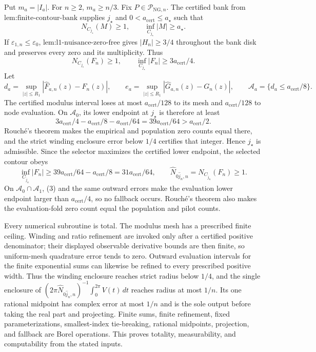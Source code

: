 Put \(m_a=|I_a|\).  For \(n\ge2\), \(m_a\ge n/3\).  Fix \(P\in\mathcal P_{\mathrm{NG},n}\).  The certified bank from \(\text{lem:finite-contour-bank}\) supplies \(j_{\star}\) and \(0<a_{\mathrm{cert}}\le a_{\star}\) such that
\[
 N_{C_{j_{\star}}}(M)\ge1,
 \qquad \inf_{C_{j_{\star}}}|M|\ge a_{\star}.
\]
If \(\varepsilon_{1,n}\le\varepsilon_0\), \(\text{lem:l1-nuisance-zero-free}\) gives \(|H_n|\ge3/4\) throughout the bank disk and preserves every zero and its multiplicity.  Thus
\[
 N_{C_{j_{\star}}}(F_n)\ge1,
 \qquad \inf_{C_{j_{\star}}}|F_n|\ge3a_{\mathrm{cert}}/4. \tag{1}
\]
Let
\[
 d_a=\sup_{|z|\le R_1}|\widehat F_{a,n}(z)-F_n(z)|,
 \qquad
 e_a=\sup_{|z|\le R_1}|\widehat G_{a,n}(z)-G_n(z)|,
 \qquad
 \mathcal A_a=\{d_a\le a_{\mathrm{cert}}/8\}.
\]
The certified modulus interval loses at most \(a_{\mathrm{cert}}/128\) to its mesh and \(a_{\mathrm{cert}}/128\) to node evaluation.  On \(\mathcal A_0\), its lower endpoint at \(j_{\star}\) is therefore at least
\[
 3a_{\mathrm{cert}}/4-a_{\mathrm{cert}}/8-a_{\mathrm{cert}}/64
 =39a_{\mathrm{cert}}/64>a_{\mathrm{cert}}/2. \tag{2}
\]
Rouch\'e's theorem makes the empirical and population zero counts equal there, and the strict winding enclosure error below \(1/4\) certifies that integer.  Hence \(j_{\star}\) is admissible.  Since the selector maximizes the certified lower endpoint, the selected contour obeys
\[
 \inf_{C_{\widehat j_n}}|F_n|
 \ge39a_{\mathrm{cert}}/64-a_{\mathrm{cert}}/8
 =31a_{\mathrm{cert}}/64,
 \qquad
 \widehat N_{0\widehat j_n,n}=N_{C_{\widehat j_n}}(F_n)\ge1. \tag{3}
\]
On \(\mathcal A_0\cap\mathcal A_1\), (3) and the same outward errors make the evaluation lower endpoint larger than \(a_{\mathrm{cert}}/4\), so no fallback occurs.  Rouch\'e's theorem also makes the evaluation-fold zero count equal the population and pilot counts.

Every numerical subroutine is total.  The modulus mesh has a prescribed finite ceiling.  Winding and ratio refinement are invoked only after a certified positive denominator; their displayed observable derivative bounds are then finite, so uniform-mesh quadrature error tends to zero.  Outward evaluation intervals for the finite exponential sums can likewise be refined to every prescribed positive width.  Thus the winding enclosure reaches strict radius below \(1/4\), and the single enclosure of \((2\pi\widehat N_{0\widehat j_n,n})^{-1}\int_0^{2\pi}V(t)\,dt\) reaches radius at most \(1/n\).  Its one rational midpoint has complex error at most \(1/n\) and is the sole output before taking the real part and projecting.  Finite sums, finite refinement, fixed parameterizations, smallest-index tie-breaking, rational midpoints, projection, and fallback are Borel operations.  This proves totality, measurability, and computability from the stated inputs.

